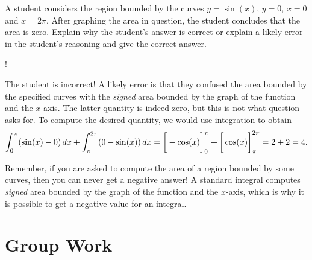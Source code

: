 \documentclass[]{ximera}
\begin{document}
\begin{problem}
A student considers the region bounded by the curves $y=\sin (x)$, $y = 0$, $x=0$ and $x=2\pi$. After graphing the area in question, the student concludes that the area is zero. Explain why the student's answer is correct or explain a likely error in the student's reasoning and give the correct answer.
\begin{center}
\resizebox {4cm} {!} { 
          }
\end{center}

\end{problem}

\begin{freeResponse}
The student is incorrect! A likely error is that they confused the area bounded by the specified curves with the \emph{signed} area bounded by the graph of the function and the $x$-axis. The latter quantity is indeed zero, but this is not what question asks for. To compute the desired quantity, we would use integration to obtain
$$
\int_0^\pi (\sin (x) - 0) \mathop{}\!d x + \int_\pi ^{2\pi} (0-\sin (x)) \mathop{}\!d x = \bigg[ -\cos(x) \bigg]_0^\pi + \bigg[ \cos(x) \bigg]_\pi^{2\pi} = 2 + 2 =4.
$$

Remember, if you are asked to compute the area of a region bounded by some curves, then you can never get a negative answer! A standard integral computes \emph{signed} area bounded by the graph of the function and the $x$-axis, which is why it is possible to get a negative value for an integral.
\end{freeResponse}



\section{Group Work}
\end{document}
